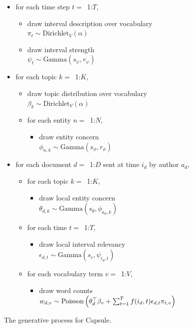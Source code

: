\begin{figure}[htb]
\begin{mdframed}
\small
\begin{itemize}[leftmargin=*]
\item for each time step $t=$~1:$T$,
	\begin{itemize}[leftmargin=*]
	\item draw interval description over vocabulary \\$\pi_t \sim \mbox{Dirichlet}_V (\alpha)$
	\item draw interval strength \\$\psi_{t} \sim \mbox{Gamma}(s_\psi, r_\psi)$
	\end{itemize}
\item for each topic $k=$~1:$K$,
	\begin{itemize}[leftmargin=*]
	\item draw topic distribution over vocabulary \\$\beta_k \sim \mbox{Dirichlet}_V (\alpha)$
	\item for each entity $n=$~1:$N$,
		\begin{itemize}[leftmargin=*]
		\item draw entity concern \\$\phi_{n,k} \sim \mbox{Gamma}(s_\phi, r_\phi)$
		\end{itemize}
	\end{itemize}
\item for each document $d=$~1:$D$ sent at time $i_d$ by author $a_d$,
	\begin{itemize}[leftmargin=*]
		\item for each topic $k=$~1:$K$,
		\begin{itemize}[leftmargin=*]
			\item draw local entity concern \\$\theta_{d,k} \sim \mbox{Gamma}(s_\theta, \phi_{a_d,k})$
		\end{itemize}
	\item for each time $t=$~1:$T$,
		\begin{itemize}[leftmargin=*]
			\item draw local interval relevancy \\$\epsilon_{d,t} \sim \mbox{Gamma}(s_\epsilon, \psi_{i_d,t})$ 
		\end{itemize}
	\item for each vocabulary term $v=$~1:$V$,
		\begin{itemize}[leftmargin=*]
			\item draw word counts $w_{d,v} \sim\\ \mbox{Poisson}\left(\theta_d^\top\beta_v + \sum_{t=1}^T f(i_d, t) \epsilon_{d,t} \pi_{t,v}\right)$
		\end{itemize}
	\end{itemize}
\end{itemize}
\end{mdframed}
\caption{The generative process for Capsule.}
\label{fig:generative-model}
\end{figure}


